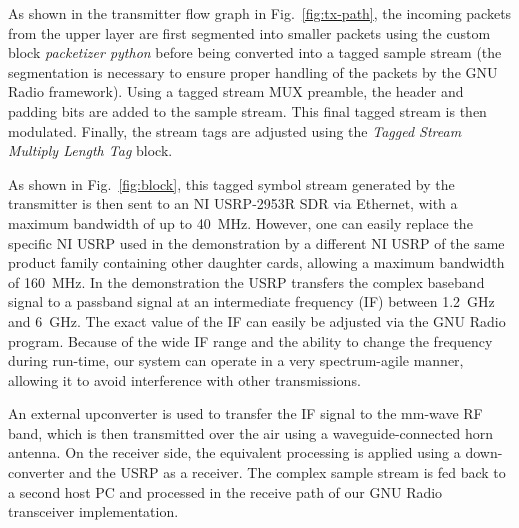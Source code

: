 \documentclass{sig-alternate}
\begin{document}
As shown in the transmitter flow graph in Fig.~\ref{fig:tx-path}, the incoming packets from the upper layer are first segmented into smaller packets using the custom block \textit{packetizer python} before being converted into a tagged sample stream (the segmentation is necessary to ensure proper handling of the packets by the GNU Radio framework).%
Using a tagged stream MUX preamble, the header and padding bits are added to the sample stream. %
This final tagged stream is then modulated. Finally, the stream tags are adjusted using the \textit{Tagged Stream Multiply Length Tag} block.%

As shown in Fig.~\ref{fig:block}, this tagged symbol stream generated by the transmitter is then sent to an NI USRP-2953R \cite{ettus} SDR via Ethernet, with a maximum bandwidth of up to 40~MHz. However, one can easily replace the specific NI USRP used in the demonstration by a different NI USRP of the same product family containing other daughter cards, allowing a maximum bandwidth of 160~MHz. In the demonstration the USRP transfers the complex baseband signal to a passband signal at an intermediate frequency (IF) between 1.2~GHz and 6~GHz. The exact value of the IF can easily be adjusted via the GNU Radio program. Because of the wide IF range and the ability to change the frequency during run-time, our system can operate in a very spectrum-agile manner, allowing it to avoid interference with other transmissions.

An external upconverter \cite{siversima} is used to transfer the IF signal to the mm-wave RF band, which is then transmitted over the air using a waveguide-connected horn antenna. On the receiver side, the equivalent  processing is applied using a down-converter and the USRP as a receiver. The complex sample stream is fed back to a second host PC and processed in the receive path of our GNU Radio transceiver implementation.
\end{document}
